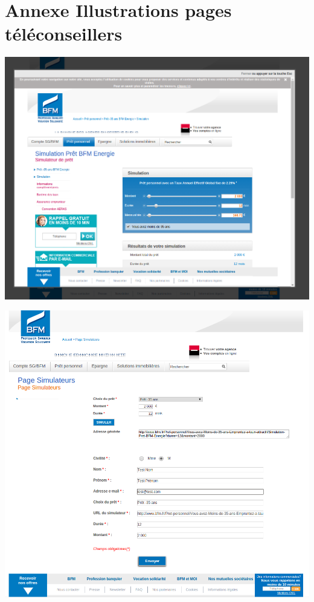 \documentclass[a4paper,11pt,twoside]{report}
\begin{document}
  \section*{Annexe Illustrations pages téléconseillers}
  \label{illustrations_pages_teleconseillers}
  \begin{center}
      \includegraphics[scale=0.34]{images/page_teleconseille2.png} 
      \label{page_teleconseille_popin_simulation}
  \end{center}
  \begin{center}
    \includegraphics[scale=0.34]{images/page_teleconseille3.png} 
    \label{page_teleconseille_formulaire_prerempli}
  \end{center}
  
\end{document}
